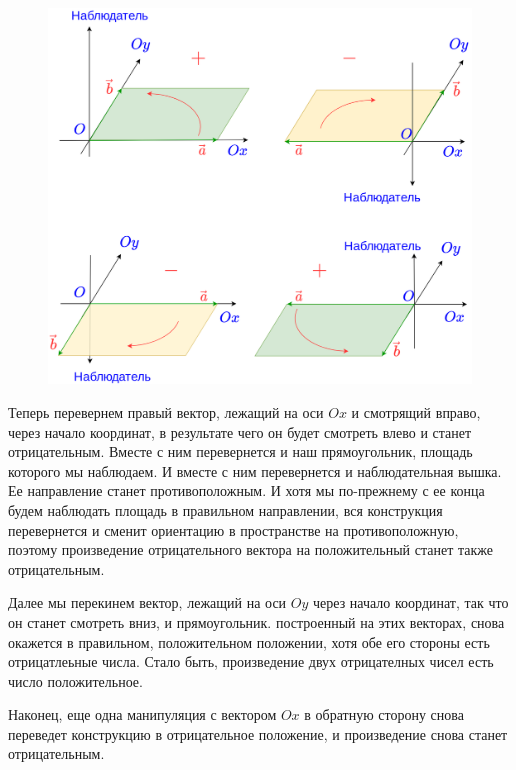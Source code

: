 \begin{enumerate}
\begin{figure}[hbt!]
\begin{center}
\includegraphics[scale=0.2]{mult.png}
\end{center}
\caption{}\label{mult}
\end{figure}

Теперь перевернем правый вектор, лежащий на оси $Ox$ и смотрящий вправо, через начало координат, в результате чего он будет смотреть влево и станет отрицательным. Вместе с ним перевернется и наш прямоугольник, площадь которого мы наблюдаем. И вместе с ним перевернется и наблюдательная вышка. Ее направление станет противоположным. И хотя мы по-прежнему с ее конца будем наблюдать площадь в правильном направлении, вся конструкция перевернется и сменит ориентацию в пространстве на противоположную, поэтому произведение отрицательного вектора на положительный станет также отрицательным.

Далее мы перекинем вектор, лежащий на оси $Oy$ через начало координат, так что он станет смотреть вниз, и прямоугольник. построенный на этих векторах, снова окажется в правильном, положительном положении, хотя обе его стороны есть отрицатлеьные числа. Стало быть, произведение двух отрицателных чисел есть число положительное.

Наконец, еще одна манипуляция с вектором $Ox$ в обратную сторону снова переведет конструкцию в отрицательное положение, и произведение снова станет отрицательным.


\end{enumerate}
